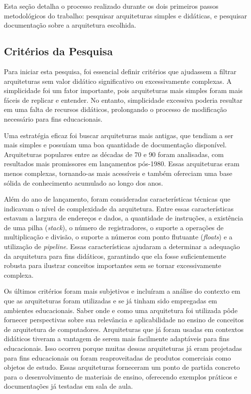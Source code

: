\documentclass[
	12pt,				%
	openright,			%
	oneside,			%
	a4paper,			%
	english,			%
	french,				%
	spanish,			%
	brazil,				%
	]{abntex2}
\begin{document}
Esta seção detalha o processo realizado durante os dois primeiros passos metodológicos do trabalho: pesquisar arquiteturas simples e didáticas, e pesquisar documentação sobre a arquitetura escolhida.

\subsection{Critérios da Pesquisa}

Para iniciar esta pesquisa, foi essencial definir critérios que ajudassem a filtrar arquiteturas sem valor didático significativo ou excessivamente complexas. A simplicidade foi um fator importante, pois arquiteturas mais simples foram mais fáceis de replicar e entender. No entanto, simplicidade excessiva poderia resultar em uma falta de recursos didáticos, prolongando o processo de modificação necessário para fins educacionais.

Uma estratégia eficaz foi buscar arquiteturas mais antigas, que tendiam a ser mais simples e possuíam uma boa quantidade de documentação disponível. Arquiteturas populares entre as décadas de 70 e 90 foram analisadas, com resultados mais promissores em lançamentos pós-1980. Essas arquiteturas eram menos complexas, tornando-as mais acessíveis e também ofereciam uma base sólida de conhecimento acumulado ao longo dos anos.

Além do ano de lançamento, foram consideradas características técnicas que indicavam o nível de complexidade da arquitetura. Entre essas características estavam a largura de endereços e dados, a quantidade de instruções, a existência de uma pilha (\textit{stack}), o número de registradores, o suporte a operações de multiplicação e divisão, o suporte a números com ponto flutuante (\textit{floats}) e a utilização de \textit{pipeline}. Essas características ajudaram a determinar a adequação da arquitetura para fins didáticos, garantindo que ela fosse suficientemente robusta para ilustrar conceitos importantes sem se tornar excessivamente complexa.

Os últimos critérios foram mais subjetivos e incluíram a análise do contexto em que as arquiteturas foram utilizadas e se já tinham sido empregadas em ambientes educacionais. Saber onde e como uma arquitetura foi utilizada pôde fornecer perspectivas sobre sua relevância e aplicabilidade no ensino de conceitos de arquitetura de computadores. Arquiteturas que já foram usadas em contextos didáticos tiveram a vantagem de serem mais facilmente adaptáveis para fins educacionais. Isso ocorreu porque muitas dessas arquiteturas já eram projetadas para fins educacionais ou foram reaproveitadas de produtos comerciais como objetos de estudo. Essas arquiteturas forneceram um ponto de partida concreto para o desenvolvimento de materiais de ensino, oferecendo exemplos práticos e documentações já testadas em sala de aula.
\end{document}
